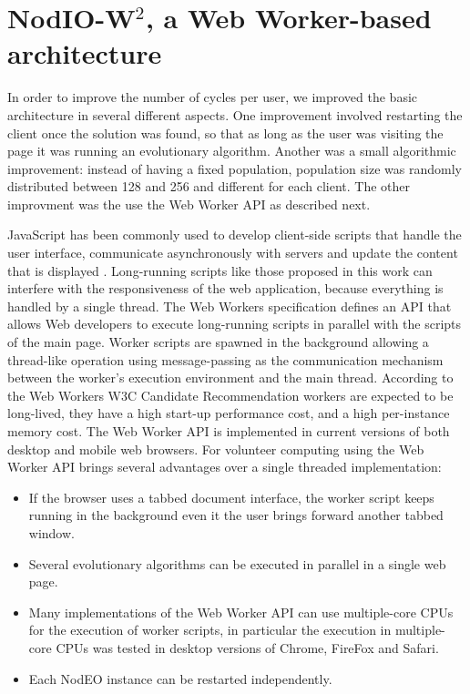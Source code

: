 \documentclass[journal,onecolumn]{IEEEtran}
\begin{document}
\section{{\sf NodIO-W$^2$}, a Web Worker-based architecture}
\label{sec:w2}

In order to improve the number of cycles per user, we improved the
basic architecture in several different aspects.  One improvement 
involved restarting the client once the solution was
found, so that as long as the user was visiting the page it was
running an evolutionary algorithm. Another was a small algorithmic
improvement: instead of having a fixed population,
population size was randomly distributed between 128 and 256 and
different for each client.  The other improvment was the 
use the Web Worker API as described next.

JavaScript has been commonly used to develop client-side scripts
that handle the user interface, communicate asynchronously with servers and
update the content that is displayed \cite{flanagan2006javascript}.
Long-running scripts like those proposed in this work can interfere with the
responsiveness of the web application, because everything is handled by a
single thread. The Web Workers specification \cite{hickson2012web} defines an
API that allows Web developers to execute long-running scripts in parallel
with the scripts of the main page. Worker scripts are spawned in the
background allowing a thread-like operation using message-passing as the
communication mechanism between the worker's execution environment and the
main thread. According to the Web Workers W3C Candidate Recommendation
\cite{hickson2012web} workers are expected to be long-lived, they have a high
start-up performance cost, and a high per-instance memory cost. The Web Worker
API is implemented in current versions of both desktop and mobile web browsers.
For volunteer computing using the Web Worker API brings several advantages
over a single threaded implementation:

\begin{itemize}
\item If the browser uses a tabbed document interface, the worker script
keeps running in the background even it the user brings forward another tabbed
window.
\item Several evolutionary algorithms can be executed in parallel in a single web
page. 
\item Many implementations of the Web Worker API can use multiple-core CPUs for
the execution of worker scripts, in particular the execution in multiple-core CPUs
was tested in desktop versions of Chrome, FireFox and Safari.
\item Each NodEO instance can be restarted independently.
\end{itemize}
\end{document}
